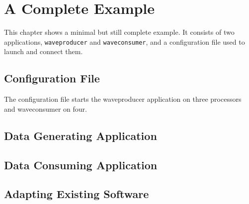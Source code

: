 \documentclass[a4paper]{report}
\begin{document}
\chapter{A Complete Example}

This chapter shows a minimal but still complete example.  It consists
of two applications, \texttt{waveproducer} and \texttt{waveconsumer},
and a configuration file used to launch and connect them.


\section{Configuration File}
\label{sec:conffile}

The configuration file starts the waveproducer application on three
processors and waveconsumer on four.




\section{Data Generating Application}




\section{Data Consuming Application}




\begin{metatext}
\chapter{Adapting Existing Software}
\end{metatext}
\end{document}
